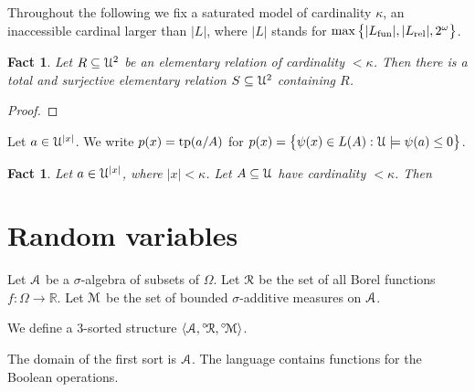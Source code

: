 \documentclass[12pt,letterpaper,oneside,reqno]{amsart}
\theoremstyle{plain}
\newtheorem{fact}[theorem]{Fact}
\theoremstyle{remark}
\renewcommand*{\emph}[1]{%
   \smash{\tikz[baseline]\node[rectangle, fill=olive!25, rounded corners, inner xsep=0.5ex, inner ysep=0.2ex, anchor=base, minimum height = 2.7ex]{#1};}}
\begin{document}
Throughout the following we fix a saturated model \emph{$\EuScript U$\/} of cardinality $\kappa$, an inaccessible cardinal larger than $|L|$, where $|L|$ stands for $\max\big\{|L_{\rm fun}|,|L_{\rm rel}|,2^\omega\big\}$.

\begin{fact}
  Let $R\subseteq{\EuScript U}^2$ be an elementary relation of cardinality $<\kappa$.
  Then there is a total and surjective elementary relation $S\subseteq{\EuScript U}^2$ containing $R$.
\end{fact}

\begin{proof}

\end{proof}

Let $a\in{\EuScript U}^{|x|}$.
We write $p(x)={\rm tp}(a/A)$ for $p(x)=\big\{\psi(x)\in L(A):{\EuScript U}\models \psi(a)\le0\big\}$.


\begin{fact}
  Let $a\in{\EuScript U}^{|x|}$, where $|x|<\kappa$.
  Let $A\subseteq{\EuScript U}$ have cardinality $<\kappa$.
  Then

\end{fact}


\section{Random variables}

Let ${\EuScript A}$ be a $\sigma$-algebra of subsets of $\Omega$.
Let ${\EuScript R}$ be the set of all Borel functions $f:\Omega\to{\mathds R}$.
Let ${\EuScript M}$ be the set of bounded $\sigma$-additive measures on ${\EuScript A}$.

We define a $3$-sorted structure $\langle{\EuScript A},{}^{\circ\!}{\EuScript R},{}^{\circ\!}{\EuScript M}\rangle$.

The domain of the first sort is ${\EuScript A}$.
The language contains functions for the Boolean operations.

\end{document}
